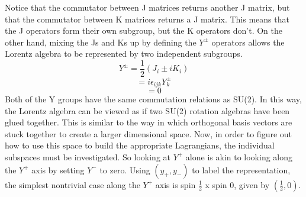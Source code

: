 Notice that the commutator between J matrices returns another J matrix, but that the commutator between K matrices returns a J matrix. This means that the J operators form their own subgroup, but the K operators don't. On the other hand, mixing the Js and Ks up by defining the $Y^{\pm}$ operators allows the Lorentz algebra to be represented by two independent subgroups. 
\begin{equation}
Y^{\pm} = \frac{1}{2}(J_i \pm iK_i)
\end{equation}
\begin{equation}
[Y^{\pm}_i, Y^{\pm}_j] = i\epsilon_{ijk}Y^{\pm}_k
\end{equation}
\begin{equation}
[Y^{\pm}_i, Y^{\mp}_j] = 0
\end{equation}
Both of the Y groups have the same commutation relations as SU(2). In this way, the Lorentz algebra can be viewed as if two SU(2) rotation algebras have been glued together. This is similar to the way in which orthogonal basis vectors are stuck together to create a larger dimensional space. Now, in order to figure out how to use this space to build the appropriate Lagrangians, the individual subspaces must be investigated. So looking at $Y^{+}$ alone is akin to looking along the $Y^{+}$ axis by setting $Y^{-}$ to zero. Using $(y_+, y_-)$ to label the representation, the simplest nontrivial case along the $Y^{+}$ axis is spin $\frac{1}{2}$ x spin 0, given by $(\frac{1}{2}, 0)$.   

